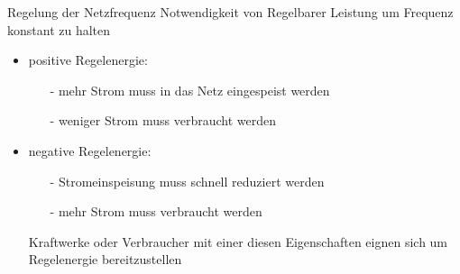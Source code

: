 \documentclass[aspectratio=1610, professionalfonts, 9pt]{beamer}
\begin{document}
\begin{frame}{Regelung der Netzfrequenz}
Notwendigkeit von Regelbarer Leistung um Frequenz konstant zu halten
\begin{itemize}
  \item positive Regelenergie:
  \begin{itemize}
    \item[-] mehr Strom muss in das Netz eingespeist werden
    \item[-] weniger Strom muss verbraucht werden
  \end{itemize}
  \item negative Regelenergie:
  \begin{itemize}
    \item[-] Stromeinspeisung muss schnell reduziert werden
    \item[-] mehr Strom muss verbraucht werden
  \end{itemize}
  \item[\rightarrow] Kraftwerke oder Verbraucher mit einer diesen Eigenschaften eignen sich um Regelenergie bereitzustellen
\end{itemize}
\end{frame}
\end{document}
